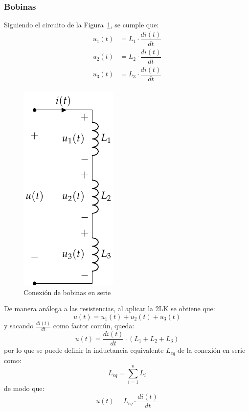 		\subsubsection{Bobinas}
		Siguiendo el circuito de la Figura~\ref{fig.bobinas-serie}, se cumple que:
		\begin{align*}
			u_1(t) &= L_1 \cdot \dfrac{di(t)}{dt}\\
			u_2(t) &= L_2 \cdot \dfrac{di(t)}{dt}\\
			u_3(t) &= L_3 \cdot \dfrac{di(t)}{dt}\\
		\end{align*}
		\begin{figure}[H]
			\centering
			\includegraphics[width=0.2\linewidth]{../figs/BobinasSerie.pdf}
			\caption{Conexión de bobinas en serie}
			\label{fig.bobinas-serie}
		\end{figure}
		De manera análoga a las resistencias, al aplicar la 2LK se obtiene que: 
		\begin{equation*}
			u(t) = u_1(t) + u_2(t) + u_3(t)
		\end{equation*}
		y sacando $\frac{di(t)}{dt}$ como factor común, queda:
		\begin{equation*}
			u(t) = \dfrac{di(t)}{dt} \cdot (L_1 + L_2 + L_3)
		\end{equation*}
		por lo que se puede definir la inductancia equivalente $L_{eq}$ de la conexión en serie como:
		\begin{equation}
			\boxed{L_{eq} = \sum_{i = 1}^n L_i}
		\end{equation}
		de modo que:
		\begin{equation*}
			u(t) = L_{eq} \cdot \dfrac{di(t)}{dt}
		\end{equation*}
